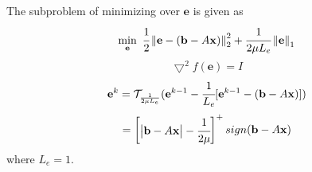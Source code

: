 \documentclass[paper=a4, fontsize=11pt]{scrartcl} %
\numberwithin{equation}{section} %
\numberwithin{figure}{section} %
\numberwithin{table}{section} %
\newcommand{\norm}[1]{\left\lVert #1 \right\rVert}
\begin{document}
The subproblem of minimizing over $\mathbf{e}$ is given as
\begin{equation}
\min_\mathbf{e}\ \cfrac{1}{2}\norm{\mathbf{e}-(\mathbf{b}-A\mathbf{x})}_2^2 + \cfrac{1}{2\mu L_e}\norm{\mathbf{e}}_1
\end{equation}
\begin{equation}
\bigtriangledown^2 f(\mathbf{e}) = I
\end{equation}
\begin{equation}
\mathbf{e}^k = \mathcal{T}_{\frac{1}{2\mu L_e}}(\mathbf{e}^{k-1} - \cfrac{1}{L_e}[\mathbf{e}^{k-1}-(\mathbf{b}-A\mathbf{x})]) 
\end{equation}
$$= \begin{bmatrix}
\begin{vmatrix}
\mathbf{b}-A\mathbf{x}
\end{vmatrix} - \cfrac{1}{2\mu}
\end{bmatrix}^+sign(\mathbf{b}-A\mathbf{x})$$
where $L_e = 1$.
\end{document}
